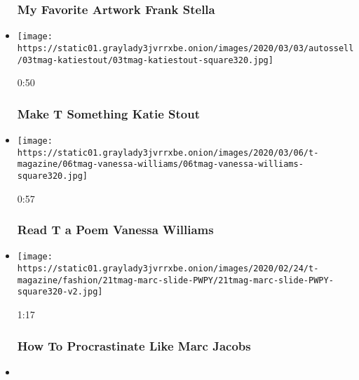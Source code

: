 \begin{itemize}
{  \subsubsection{My Favorite Artwork \textbar{} Frank
  Stella}\label{my-favorite-artwork--frank-stella}}
\item
  \href{https://www.nytimes3xbfgragh.onion/video/t-magazine/100000007006059/make-t-something-katie-stout.html?action=click\&module=video-series-bar\&region=header\&pgtype=Article\&playlistId=video/t-magazine}{}

  \texttt{[image: https://static01.graylady3jvrrxbe.onion/images/2020/03/03/autossell/03tmag-katiestout/03tmag-katiestout-square320.jpg]}

  0:50

  \hypertarget{make-t-something--katie-stout}{%
  \subsubsection{Make T Something \textbar{} Katie
  Stout}\label{make-t-something--katie-stout}}
\item
  \href{https://www.nytimes3xbfgragh.onion/video/t-magazine/100000007020348/vanessa-williams-maya-angelou.html?action=click\&module=video-series-bar\&region=header\&pgtype=Article\&playlistId=video/t-magazine}{}

  \texttt{[image: https://static01.graylady3jvrrxbe.onion/images/2020/03/06/t-magazine/06tmag-vanessa-williams/06tmag-vanessa-williams-square320.jpg]}

  0:57

  \hypertarget{read-t-a-poem--vanessa-williams}{%
  \subsubsection{Read T a Poem \textbar{} Vanessa
  Williams}\label{read-t-a-poem--vanessa-williams}}
\item
  \href{https://www.nytimes3xbfgragh.onion/video/t-magazine/fashion/100000006992316/how-to-procrastinate-like-marc-jacobs.html?action=click\&module=video-series-bar\&region=header\&pgtype=Article\&playlistId=video/t-magazine}{}

  \texttt{[image: https://static01.graylady3jvrrxbe.onion/images/2020/02/24/t-magazine/fashion/21tmag-marc-slide-PWPY/21tmag-marc-slide-PWPY-square320-v2.jpg]}

  1:17

  \hypertarget{how-to--procrastinate-like-marc-jacobs}{%
  \subsubsection{How To \textbar{} Procrastinate Like Marc
  Jacobs}\label{how-to--procrastinate-like-marc-jacobs}}
\item
  \href{https://www.nytimes3xbfgragh.onion/video/t-magazine/fashion/100000006990423/of-a-kind-diane-von-furstenburg.html?action=click\&module=video-series-bar\&region=header\&pgtype=Article\&playlistId=video/t-magazine}{}


\end{itemize}
